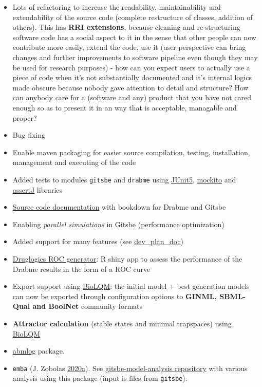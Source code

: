 \documentclass[
  12pt,
]{book}
\providecommand{\tightlist}{%
  \setlength{\itemsep}{0pt}\setlength{\parskip}{0pt}}
\begin{document}
\begin{itemize}
\tightlist
\item
  Lots of refactoring to increase the readability, maintainability and
  extendability of the source code (complete restructure of classes, addition of
  others).
  This has \textbf{RRI extensions}, because cleaning and re-structuring software code has a social aspect to it in the sense that other people can now contribute more easily, extend the code, use it (user perspective can bring changes and further improvements to software pipeline even though they may be used for research purposes) - how can you expect users to actually use a piece of code when it's not substantially documented and it's internal logics made obscure because nobody gave attention to detail and structure? How can anybody care for a (software and any) product that you have not cared enough so as to present it in an way that is acceptable, managable and proper?
\item
  Bug fixing
\item
  Enable maven packaging for easier source compilation, testing,
  installation, management and executing of the code
\item
  Added tests to modules \texttt{gitsbe} and \texttt{drabme} using \href{https://junit.org/junit5/}{JUnit5}, \href{https://site.mockito.org/}{mockito} and \href{https://assertj.github.io/doc/}{assertJ} libraries
\item
  \href{https://druglogics.github.io/druglogics-doc/}{Source code documentation} with bookdown for Drabme and Gitsbe
\item
  Enabling \emph{parallel simulations} in Gitsbe (performance optimization)
\item
  Added support for many features (see \href{http://tiny.cc/DLDevPlan}{dev\_plan\_doc})
\item
  \href{https://github.com/bblodfon/druglogics-roc}{Druglogics ROC generator}:
  R shiny app to assess the performance of the Drabme results in the form of a
  ROC curve
\item
  Export support using \href{https://github.com/colomoto/bioLQM}{BioLQM}: the initial model + best generation models can now be exported through configuration options to \textbf{GINML, SBML-Qual and BoolNet} community formats
\item
  \textbf{Attractor calculation} (stable states and minimal trapspaces) using \href{https://github.com/colomoto/bioLQM}{BioLQM}
\item
  \href{https://github.com/druglogics/abmlog}{abmlog} package.
\item
  \texttt{emba} (J. Zobolas \protect\hyperlink{ref-R-emba}{2020}\protect\hyperlink{ref-R-emba}{a}).
  See \href{https://github.com/bblodfon/gitsbe-model-analysis/}{gitsbe-model-analysis repository} with various analysis using this package (input is files from \texttt{gitsbe}).
\end{itemize}
\end{document}
